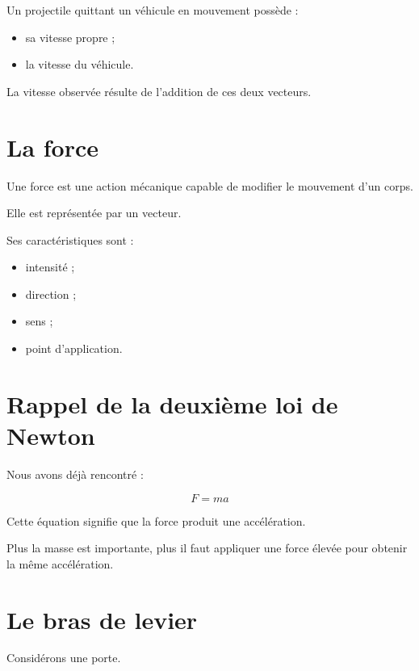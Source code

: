 \begin{exemple}

Un projectile quittant un véhicule en mouvement possède :

\begin{itemize}
    \item sa vitesse propre ;
    \item la vitesse du véhicule.
\end{itemize}

La vitesse observée résulte de l'addition de ces deux vecteurs.

\end{exemple}

\section{La force}

Une force est une action mécanique capable de modifier le mouvement d'un
corps.

Elle est représentée par un vecteur.

Ses caractéristiques sont :

\begin{itemize}
    \item intensité ;
    \item direction ;
    \item sens ;
    \item point d'application.
\end{itemize}

\section{Rappel de la deuxième loi de Newton}

Nous avons déjà rencontré :

\begin{equation}
F = ma
\end{equation}

Cette équation signifie que la force produit une accélération.

Plus la masse est importante, plus il faut appliquer une force élevée pour
obtenir la même accélération.

\section{Le bras de levier}

Considérons une porte.

